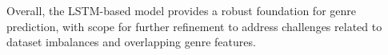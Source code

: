 \documentclass[conference]{IEEEtran}
\begin{document}
Overall, the LSTM-based model provides a robust foundation for genre prediction, with scope for further refinement to address challenges related to dataset imbalances and overlapping genre features.











\cite{1}
\cite{2}
\cite{3}
\cite{4}
\end{document}
